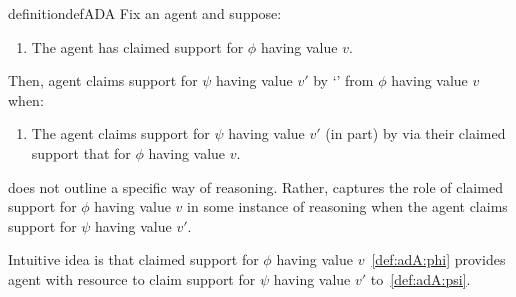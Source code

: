 

\begin{note}
  \begin{restatable}[\adA{}]{definition}{defADA}\label{AR:adA}\label{def:adA}
    Fix an agent and suppose:
    \begin{enumerate}[label=\textsf{S:\arabic*}., ref=(\textsf{S}:\arabic*), series=adA_counter]
    \item\label{def:adA:phi} The agent has claimed support for \(\phi\) having value \(v\).
    \end{enumerate}
    Then, agent claims support for \(\psi\) having value \(v'\) by `\adA{}' from \(\phi\) having value \(v\) when:
    \begin{enumerate}[label=\textsf{S:\arabic*}., ref=(\textsf{S}:\arabic*), resume*=adA_counter]
    \item\label{def:adA:psi} The agent claims support for \(\psi\) having value \(v'\) (in part) by via their claimed support that for \(\phi\) having value \(v\).
    \end{enumerate}
    \vspace{-\baselineskip}
  \end{restatable}
\end{note}

\begin{note}
  \adA{} does not outline a specific way of reasoning.
  Rather, captures the role of claimed support for \(\phi\) having value \(v\) in some instance of reasoning when the agent claims support for \(\psi\) having value \(v'\).

  Intuitive idea is that claimed support for \(\phi\) having value \(v\)~\ref{def:adA:phi} provides agent with resource to claim support for \(\psi\) having value \(v'\) to~\ref{def:adA:psi}.
\end{note}

